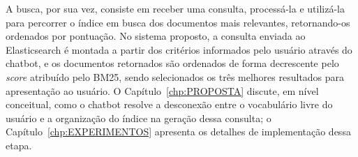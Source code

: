 A busca, por sua vez, consiste em receber uma consulta, processá-la e utilizá-la para percorrer o índice em busca dos documentos mais relevantes, retornando-os ordenados por pontuação. No sistema proposto, a consulta enviada ao Elasticsearch é montada a partir dos critérios informados pelo usuário através do chatbot, e os documentos retornados são ordenados de forma decrescente pelo \textit{score} atribuído pelo BM25, sendo selecionados os três melhores resultados para apresentação ao usuário. O Capítulo~\ref{chp:PROPOSTA} discute, em nível conceitual, como o chatbot resolve a desconexão entre o vocabulário livre do usuário e a organização do índice na geração dessa consulta; o Capítulo~\ref{chp:EXPERIMENTOS} apresenta os detalhes de implementação dessa etapa.
